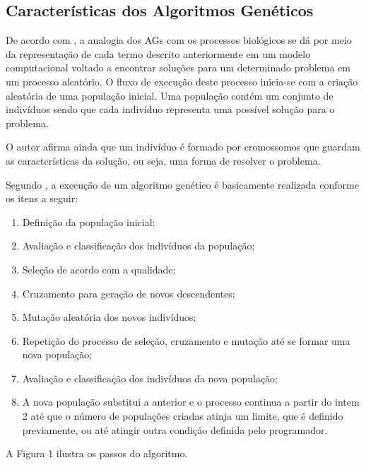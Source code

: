 \subsection{Características dos Algoritmos Genéticos}

\par De acordo com , a analogia dos AGs com
os processos biológicos se dá por meio da representação de cada termo descrito
anteriormente em um modelo computacional voltado a encontrar soluções para um
determinado problema em um processo aleatório. O fluxo de execução deste processo
inicia-se com a criação aleatória de uma população inicial. Uma população contém
um conjunto de indivíduos sendo que cada indivíduo  representa uma possível solução
para o problema.

\par O autor afirma ainda que um indivíduo é formado por cromossomos que
guardam as características da solução, ou seja, uma forma de resolver o
problema.

\par Segundo , a execução de um 
algoritmo genético é basicamente realizada conforme os itens a seguir:

\begin{enumerate}
	\item Definição da população inicial;
	\item Avaliação e classificação dos indivíduos da população;
	\item Seleção de acordo com a qualidade;
	\item Cruzamento para geração de novos descendentes;
	\item Mutação aleatória dos novos indivíduos;
	\item Repetição do processo de seleção, cruzamento e mutação até se formar uma nova população;
	\item Avaliação e classificação dos indivíduos da nova população;
	\item A nova população substitui a anterior e o processo continua a partir do
	intem 2 até que o número de populações criadas atinja um limite, que é definido
	previamente, ou até atingir outra condição definida pelo programador.
\end{enumerate}

\par A Figura 1 ilustra os passos do algoritmo.


